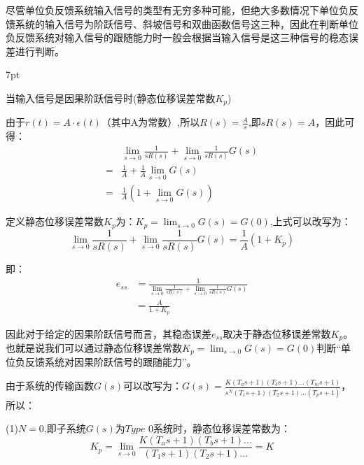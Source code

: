\documentclass{article}
\numberwithin{equation}{section}
\numberwithin{figure}{section}
\newenvironment{formal}{%
\def\FrameCommand{%
\hspace{1pt}%
{\color{DarkBlue}\vrule width 2pt}%
{\color{formalshade}\vrule width 4pt}%
\colorbox{formalshade}%
}%
\MakeFramed{\advance\hsize-\width\FrameRestore}%
\noindent\hspace{-4.55pt}%
\begin{adjustwidth}{}{7pt}%
\vspace{2pt}\vspace{2pt}%
}
{%
\vspace{2pt}\end{adjustwidth}\endMakeFramed%
}
\begin{document}
尽管单位负反馈系统输入信号的类型有无穷多种可能，但绝大多数情况下单位负反馈系统的输入信号为阶跃信号、斜坡信号和双曲函数信号这三种，因此在判断单位负反馈系统对输入信号的跟随能力时一般会根据当输入信号是这三种信号的稳态误差进行判断。
\begin{formal}
    当输入信号是因果阶跃信号时(静态位移误差常数$K_p$)
\end{formal}

    由于$r(t)=A·\epsilon(t)$（其中A为常数）,所以$R(s)=\frac{A}{s}$,即$sR(s)=A$，因此可得：
    \begin{equation}
        \begin{split}
            &\lim_{s\rightarrow 0}\frac{1}{sR(s)}+\lim_{s\rightarrow 0}\frac{1}{sR(s)}G(s)\\
            =&\frac{1}{A}+\frac{1}{A}\lim_{s\rightarrow 0}G(s)\\
            =&\frac{1}{A}(1+\lim_{s\rightarrow 0}G(s))
        \end{split}
    \end{equation}
    
    定义静态位移误差常数$K_p$为：$K_p=\lim_{s\rightarrow 0}G(s)=G(0)$,上式可以改写为：
    \begin{equation}
        \lim_{s\rightarrow 0}\frac{1}{sR(s)}+\lim_{s\rightarrow 0}\frac{1}{sR(s)}G(s)=\frac{1}{A}(1+K_p)
    \end{equation}

    即：
    \begin{equation}
        \begin{split}
            e_{ss}&=\frac{1}{\lim_{s\rightarrow 0}\frac{1}{sR(s)}+\lim_{s\rightarrow 0}\frac{1}{sR(s)}G(s)}\\
            &=\frac{A}{1+K_p}
        \end{split}
    \end{equation}

    因此对于给定的因果阶跃信号而言，其稳态误差$e_{ss}$取决于静态位移误差常数$K_p$。也就是说我们可以通过静态位移误差常数$K_p=\lim_{s\rightarrow 0}G(s)=G(0)$判断“单位负反馈系统对因果阶跃信号的跟随能力”。

    由于系统的传输函数$G(s)$可以改写为：$G(s)=\frac{K(T_as+1)(T_bs+1)...(T_ms+1)}{s^N(T_1s+1)(T_2s+1)...(T_ps+1)}$，所以：
    
    (1)$N=0$,即子系统$G(s)$为$Type$ $0$系统时，静态位移误差常数为：
    \begin{equation}
        K_p=\lim_{s\rightarrow 0}\frac{K(T_as+1)(T_bs+1)...}{(T_1s+1)(T_2s+1)...}=K
    \end{equation}
    
\end{document}
